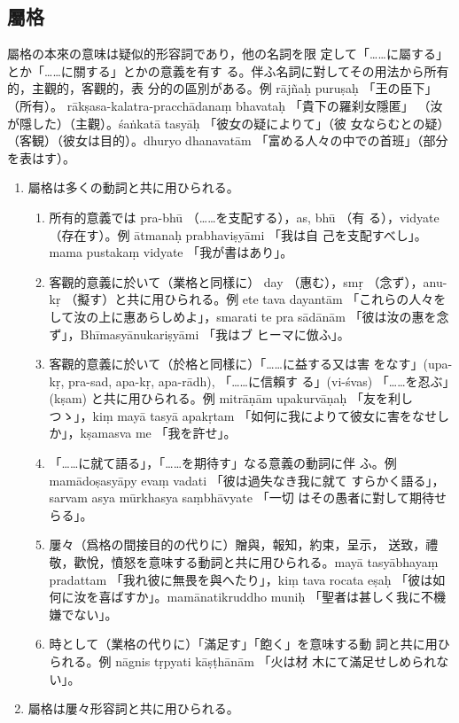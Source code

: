 \subsection{屬格}
\numberParagraph \label{np:229}
屬格の本來の意味は疑似的形容詞であり，他の名詞を限
定して「……に屬する」とか「……に關する」とかの意義を有す
る。伴ふ名詞に對してその用法から所有的，主觀的，客觀的，表
分的の區別がある。例 rājñaḥ puruṣaḥ 「王の臣下」（所有）。
rākṣasa-kalatra-pracchādanaṃ bhavataḥ 「貴下の羅刹女隱匿」
（汝が隱した）（主觀）。śaṅkatā tasyāḥ 「彼女の疑によりて」（彼
女ならむとの疑）（客観）（彼女は目的）。dhuryo dhanavatām
「富める人々の中での首班」（部分を表はす）。
\begin{enumerate}[label=(\arabic*)]
\item 屬格は多くの動詞と共に用ひられる。
\begin{enumerate}[label=(\alph*)]
\item 所有的意義では pra-bhū （……を支配する），as, bhū （有
る），vidyate （存在す）。例 ātmanaḥ prabhaviṣyāmi 「我は自
己を支配すべし」。mama pustakaṃ vidyate 「我が書はあり」。
\item 客觀的意義に於いて（業格と同樣に） day （惠む），smṛ
（念ず），anu-kṛ （擬す）と共に用ひられる。例 ete tava dayantām
「これらの人々をして汝の上に惠あらしめよ」，smarati te pra\-%
sādānām 「彼は汝の惠を念ず」，Bhīmasyānukariṣyāmi 「我はブ
ヒーマに倣ふ」。
\item 客觀的意義に於いて（於格と同樣に）「……に益する又は害
をなす」(upa-kṛ, pra-sad, apa-kṛ, apa-rādh), 「……に信賴す
る」(vi-śvas) 「……を忍ぶ」(kṣam) と共に用ひられる。例
mitrāṇām upakurvāṇaḥ 「友を利しつゝ」，kiṃ mayā tasyā
apakṛtam 「如何に我によりて彼女に害をなせしか」，kṣamasva
me 「我を許せ」。
\item \label{item:229d} 「……に就て語る」，「……を期待す」なる意義の動詞に伴
ふ。例 mamādoṣasyāpy evaṃ vadati 「彼は過失なき我に就て
すらかく語る」，sarvam asya mūrkhasya saṃbhāvyate 「一切
はその愚者に對して期待せらる」。
\item 屢々（爲格の間接目的の代りに）贈與，報知，約束，呈示，
送致，禮敬，歡悅，憤怒を意味する動詞と共に用ひられる。mayā
tasyābhayaṃ pradattam 「我れ彼に無畏を與へたり」，kiṃ tava
rocata eṣaḥ 「彼は如何に汝を喜ばすか」。mamānatikruddho
muniḥ 「聖者は甚しく我に不機嫌でない」。
\item 時として（業格の代りに）「滿足す」「飽く」を意味する動
詞と共に用ひられる。例 nāgnis tṛpyati kāṣṭhānām 「火は材
木にて滿足せしめられない」。
\end{enumerate}
\item 屬格は屢々形容詞と共に用ひられる。

\end{enumerate}
